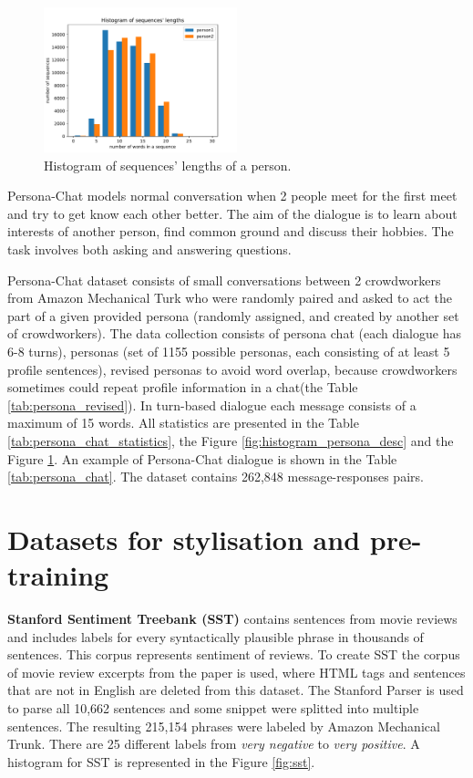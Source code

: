 \begin{figure}
  \centering
  \includegraphics[width=0.5\textwidth]{figures/uttr_length.pdf}
  \caption{Histogram of sequences' lengths of a person.}
  \label{fig:histogram_uttr_length}
\end{figure}

Persona-Chat models normal conversation when 2 people meet for the first meet and try to get know each other better. The aim of the dialogue is to learn about interests of another person, find common ground and discuss their hobbies. The task involves both asking and answering questions. 

Persona-Chat dataset consists of small conversations between 2 crowdworkers from Amazon Mechanical Turk who were randomly paired and asked to act the part of a given provided persona (randomly assigned, and created by another set of crowdworkers). The data collection consists of persona chat (each dialogue has 6-8 turns), personas (set of 1155 possible personas, each consisting of at least 5 profile sentences), revised personas to avoid word overlap, because crowdworkers sometimes could repeat profile information in a chat(the Table \ref{tab:persona_revised}). In turn-based dialogue each message consists of a maximum of 15 words. All statistics are presented in the Table \ref{tab:persona_chat_statistics}, the Figure \ref{fig:histogram_persona_desc} and the Figure \ref{fig:histogram_uttr_length}. An example of Persona-Chat dialogue is shown in the Table \ref{tab:persona_chat}. The dataset contains 262,848 message-responses pairs.

\section{Datasets for stylisation and pre-training} \label{stylistic_dataset_section}
\textbf{Stanford Sentiment Treebank (SST)} contains sentences from movie reviews and includes labels for every syntactically plausible phrase in thousands of sentences. This corpus represents sentiment of reviews. To create SST the corpus of movie review excerpts from the paper \cite{pang2005seeing} is used, where HTML tags and sentences that are not in English are deleted from this dataset. The Stanford Parser is used to parse all 10,662 sentences and some snippet were splitted into multiple sentences. The resulting 215,154 phrases were labeled by Amazon Mechanical Trunk. There are 25 different labels from \textit{very negative} to \textit{very positive}. A histogram for SST is represented in the Figure \ref{fig:sst}.

